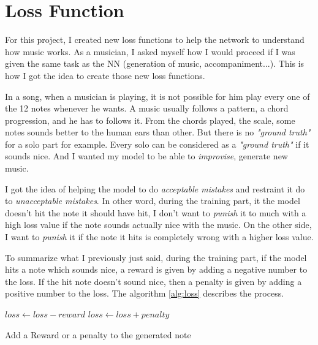\documentclass[12pt]{report}
\begin{document}

\section{Loss Function}
\label{sec:loss}

For this project, I created new loss functions to help the network to understand how music works.
As a musician, I asked myself how I would proceed if I was given the same task as the NN (generation of music, accompaniment...).
This is how I got the idea to create those new loss functions.

In a song, when a musician is playing, it is not possible for him play every one of the 12 notes whenever he wants.
A music usually follows a pattern, a chord progression, and he has to follows it.
From the chords played, the scale, some notes sounds better to the human ears than other.
But there is no \textit{"ground truth"} for a solo part for example.
Every solo can be considered as a \textit{"ground truth"} if it sounds nice.
And I wanted my model to be able to \textit{improvise}, generate new music.

I got the idea of helping the model to do \textit{acceptable mistakes} and restraint it do to \textit{unacceptable mistakes}.
In other word, during the training part, it the model doesn't hit the note it should have hit, I don't want to \textit{punish} it to much with a high loss value if the note sounds actually nice with the music.
On the other side, I want to \textit{punish} it if the note it hits is completely wrong with a higher loss value.

To summarize what I previously just said, during the training part, if the model hits a note which sounds nice, a reward is given by adding a negative number to the loss.
If the hit note doesn't sound nice, then a penalty is given by adding a positive number to the loss.
The algorithm \ref{alg:loss} describes the process.

\begin{algorithm}
    \begin{algorithmic}[1]
        \Statex
                \State $loss \gets loss - reward$
            \Else
                \State $loss \gets loss + penalty$
            \EndIf
            \State {}
        \EndFunction
    \end{algorithmic}
    \caption{Add a Reward or a penalty to the generated note}
    \label{alg:loss}
\end{algorithm}
\end{document}
